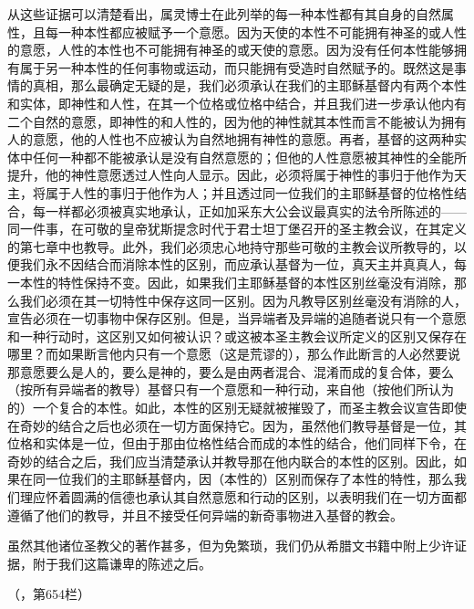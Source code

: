 从这些证据可以清楚看出，属灵博士在此列举的每一种本性都有其自身的自然属性，且每一种本性都应被赋予一个意愿。因为天使的本性不可能拥有神圣的或人性的意愿，人性的本性也不可能拥有神圣的或天使的意愿。因为没有任何本性能够拥有属于另一种本性的任何事物或运动，而只能拥有受造时自然赋予的。既然这是事情的真相，那么最确定无疑的是，我们必须承认在我们的主耶稣基督内有两个本性和实体，即神性和人性，在其一个位格或位格中结合，并且我们进一步承认他内有二个自然的意愿，即神性的和人性的，因为他的神性就其本性而言不能被认为拥有人的意愿，他的人性也不应被认为自然地拥有神性的意愿。再者，基督的这两种实体中任何一种都不能被承认是没有自然意愿的；但他的人性意愿被其神性的全能所提升，他的神性意愿透过人性向人显示。因此，必须将属于神性的事归于他作为天主，将属于人性的事归于他作为人；并且透过同一位我们的主耶稣基督的位格性结合，每一样都必须被真实地承认，正如加采东大公会议最真实的法令所陈述的——同一件事，在可敬的皇帝犹斯提念时代于君士坦丁堡召开的圣主教会议，在其定义的第七章中也教导。此外，我们必须忠心地持守那些可敬的主教会议所教导的，以便我们永不因结合而消除本性的区别，而应承认基督为一位，真天主并真真人，每一本性的特性保持不变。因此，如果我们主耶稣基督的本性区别丝毫没有消除，那么我们必须在其一切特性中保存这同一区别。因为凡教导区别丝毫没有消除的人，宣告必须在一切事物中保存区别。但是，当异端者及异端的追随者说只有一个意愿和一种行动时，这区别又如何被认识？或这被本圣主教会议所定义的区别又保存在哪里？而如果断言他内只有一个意愿（这是荒谬的），那么作此断言的人必然要说那意愿要么是人的，要么是神的，要么是由两者混合、混淆而成的复合体，要么（按所有异端者的教导）基督只有一个意愿和一种行动，来自他（按他们所认为的）一个复合的本性。如此，本性的区别无疑就被摧毁了，而圣主教会议宣告即使在奇妙的结合之后也必须在一切方面保持它。因为，虽然他们教导基督是一位，其位格和实体是一位，但由于那由位格性结合而成的本性的结合，他们同样下令，在奇妙的结合之后，我们应当清楚承认并教导那在他内联合的本性的区别。因此，如果在同一位我们的主耶稣基督内，因（本性的）区别而保存了本性的特性，那么我们理应怀着圆满的信德也承认其自然意愿和行动的区别，以表明我们在一切方面都遵循了他们的教导，并且不接受任何异端的新奇事物进入基督的教会。\par

虽然其他诸位圣教父的著作甚多，但为免繁琐，我们仍从希腊文书籍中附上少许证据，附于我们这篇谦卑的陈述之后。\par

（，第654栏）\par

